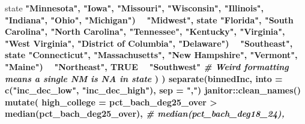 \documentclass[
  11pt,
]{article}
\newenvironment{Shaded}{\begin{snugshade}}{\end{snugshade}}
\newcommand{\CommentTok}[1]{\textcolor[rgb]{0.56,0.35,0.01}{\textit{#1}}}
\newcommand{\DataTypeTok}[1]{\textcolor[rgb]{0.13,0.29,0.53}{#1}}
\newcommand{\KeywordTok}[1]{\textcolor[rgb]{0.13,0.29,0.53}{\textbf{#1}}}
\newcommand{\NormalTok}[1]{#1}
\newcommand{\OperatorTok}[1]{\textcolor[rgb]{0.81,0.36,0.00}{\textbf{#1}}}
\newcommand{\OtherTok}[1]{\textcolor[rgb]{0.56,0.35,0.01}{#1}}
\newcommand{\StringTok}[1]{\textcolor[rgb]{0.31,0.60,0.02}{#1}}
\begin{document}
\begin{Shaded}
\begin{Highlighting}[]
{{{{{\NormalTok{      state }\OperatorTok{%
                   \StringTok{"Minnesota"}\NormalTok{, }\StringTok{"Iowa"}\NormalTok{, }\StringTok{"Missouri"}\NormalTok{, }\StringTok{"Wisconsin"}\NormalTok{, }\StringTok{"Illinois"}\NormalTok{, }
                   \StringTok{"Indiana"}\NormalTok{, }\StringTok{"Ohio"}\NormalTok{, }\StringTok{"Michigan"}\NormalTok{) }\OperatorTok{~}\StringTok{ "Midwest"}\NormalTok{,}
\NormalTok{      state }\OperatorTok{%
                   \StringTok{"Florida"}\NormalTok{, }\StringTok{"South Carolina"}\NormalTok{, }\StringTok{"North Carolina"}\NormalTok{, }\StringTok{"Tennessee"}\NormalTok{,}
                   \StringTok{"Kentucky"}\NormalTok{, }\StringTok{"Virginia"}\NormalTok{, }\StringTok{"West Virginia"}\NormalTok{, }\StringTok{"District of Columbia"}\NormalTok{,}
                   \StringTok{"Delaware"}\NormalTok{) }\OperatorTok{~}\StringTok{ "Southeast"}\NormalTok{,}
\NormalTok{      state }\OperatorTok{%
                   \StringTok{"Connecticut"}\NormalTok{, }\StringTok{"Massachusetts"}\NormalTok{, }\StringTok{"New Hampshire"}\NormalTok{, }\StringTok{"Vermont"}\NormalTok{, }\StringTok{"Maine"}\NormalTok{) }\OperatorTok{~}\StringTok{ "Northeast"}\NormalTok{,}
      \OtherTok{TRUE} \OperatorTok{~}\StringTok{ "Southwest"} \CommentTok{# Weird formatting means a single NM is NA in state}
\NormalTok{    )}
\NormalTok{  ) }\OperatorTok{%
\StringTok{  }\KeywordTok{separate}\NormalTok{(binnedInc, }\DataTypeTok{into =} \KeywordTok{c}\NormalTok{(}\StringTok{"inc_dec_low"}\NormalTok{, }\StringTok{"inc_dec_high"}\NormalTok{), }\DataTypeTok{sep =} \StringTok{","}\NormalTok{) }\OperatorTok{%
\StringTok{  }\NormalTok{janitor}\OperatorTok{::}\KeywordTok{clean_names}\NormalTok{() }\OperatorTok{%
\StringTok{  }\KeywordTok{mutate}\NormalTok{(}
    \DataTypeTok{high_college =}\NormalTok{ pct_bach_deg25_over }\OperatorTok{>}\StringTok{ }\KeywordTok{median}\NormalTok{(pct_bach_deg25_over), }\CommentTok{# median(pct_bach_deg18_24),}
}}}}}}}}}}}
\end{Highlighting}
\end{Shaded}
\end{document}
